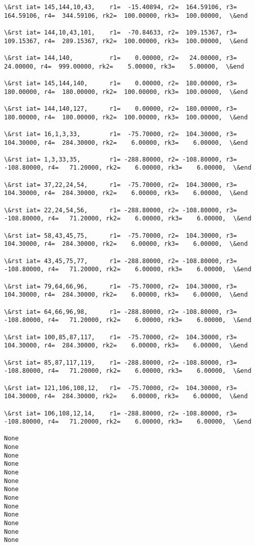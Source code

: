 \documentclass[11pt]{article}
\begin{document}
\begin{Verbatim}[commandchars=\\\{\}]
\&rst iat= 145,144,10,43,    r1=  -15.40894, r2=  164.59106, r3=  164.59106, r4=  344.59106, rk2=  100.00000, rk3=  100.00000,  \&end

\&rst iat= 144,10,43,101,    r1=  -70.84633, r2=  109.15367, r3=  109.15367, r4=  289.15367, rk2=  100.00000, rk3=  100.00000,  \&end

\&rst iat= 144,140,          r1=    0.00000, r2=   24.00000, r3=   24.00000, r4=  999.00000, rk2=    5.00000, rk3=    5.00000,  \&end

\&rst iat= 145,144,140,      r1=    0.00000, r2=  180.00000, r3=  180.00000, r4=  180.00000, rk2=  100.00000, rk3=  100.00000,  \&end

\&rst iat= 144,140,127,      r1=    0.00000, r2=  180.00000, r3=  180.00000, r4=  180.00000, rk2=  100.00000, rk3=  100.00000,  \&end

\&rst iat= 16,1,3,33,        r1=  -75.70000, r2=  104.30000, r3=  104.30000, r4=  284.30000, rk2=    6.00000, rk3=    6.00000,  \&end

\&rst iat= 1,3,33,35,        r1= -288.80000, r2= -108.80000, r3= -108.80000, r4=   71.20000, rk2=    6.00000, rk3=    6.00000,  \&end

\&rst iat= 37,22,24,54,      r1=  -75.70000, r2=  104.30000, r3=  104.30000, r4=  284.30000, rk2=    6.00000, rk3=    6.00000,  \&end

\&rst iat= 22,24,54,56,      r1= -288.80000, r2= -108.80000, r3= -108.80000, r4=   71.20000, rk2=    6.00000, rk3=    6.00000,  \&end

\&rst iat= 58,43,45,75,      r1=  -75.70000, r2=  104.30000, r3=  104.30000, r4=  284.30000, rk2=    6.00000, rk3=    6.00000,  \&end

\&rst iat= 43,45,75,77,      r1= -288.80000, r2= -108.80000, r3= -108.80000, r4=   71.20000, rk2=    6.00000, rk3=    6.00000,  \&end

\&rst iat= 79,64,66,96,      r1=  -75.70000, r2=  104.30000, r3=  104.30000, r4=  284.30000, rk2=    6.00000, rk3=    6.00000,  \&end

\&rst iat= 64,66,96,98,      r1= -288.80000, r2= -108.80000, r3= -108.80000, r4=   71.20000, rk2=    6.00000, rk3=    6.00000,  \&end

\&rst iat= 100,85,87,117,    r1=  -75.70000, r2=  104.30000, r3=  104.30000, r4=  284.30000, rk2=    6.00000, rk3=    6.00000,  \&end

\&rst iat= 85,87,117,119,    r1= -288.80000, r2= -108.80000, r3= -108.80000, r4=   71.20000, rk2=    6.00000, rk3=    6.00000,  \&end

\&rst iat= 121,106,108,12,   r1=  -75.70000, r2=  104.30000, r3=  104.30000, r4=  284.30000, rk2=    6.00000, rk3=    6.00000,  \&end

\&rst iat= 106,108,12,14,    r1= -288.80000, r2= -108.80000, r3= -108.80000, r4=   71.20000, rk2=    6.00000, rk3=    6.00000,  \&end

None
None
None
None
None
None
None
None
None
None
None
None
None

    \end{Verbatim}
\end{document}
